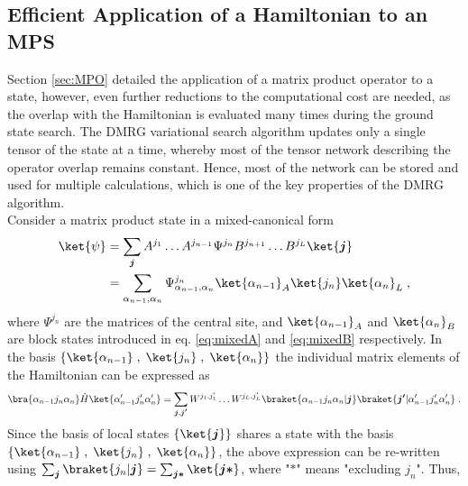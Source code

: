 \subsection{Efficient Application of a Hamiltonian to an MPS}
Section \ref{sec:MPO} detailed the application of a matrix product operator to a state, however, even further reductions to the computational cost are needed, as the overlap with the Hamiltonian is evaluated many times during the ground state search. The DMRG variational search algorithm updates only a single tensor of the state at a time, whereby most of the tensor network describing the operator overlap remains constant. Hence, most of the network can be stored and used for multiple calculations, which is one of the key properties of the DMRG algorithm.\\ 
Consider a matrix product state in a mixed-canonical form
\begin{align}
	\ket{\psi} &= \sum_{\boldsymbol{j}} A^{j_1} \ldots A^{j_{n-1}} \Psi^{j_n} B^{j_{n+1}} \ldots B^{j_{L}} \ket{\boldsymbol{j}} \nonumber \\
	&= \sum_{\alpha_{n-1} , \alpha_{n}} \Psi_{\alpha_{n-1} , \alpha_{n}}^{j_n} \ket{\alpha_{n-1}}_A \ket{j_n}  \ket{\alpha_{n}}_L \; ,
	\label{eq:MPSmixedsingle}
\end{align}
where $\Psi^{j_n}$ are the matrices of the central site, and $\ket{\alpha_{n-1}}_A$ and $\ket{\alpha_{n}}_B$ are block states introduced in eq. \eqref{eq:mixedA} and \eqref{eq:mixedB} respectively. In the basis $\{ \ket{\alpha_{n-1} } \; , \; \ket{ j_n } \; , \; \ket{\alpha_{n} } \}$ the individual matrix elements of the Hamiltonian can be expressed as
\begin{equation*}
	\bra{\alpha_{n-1} j_n \alpha_{n}} \hat{H} \ket{\alpha_{n-1} ' j_n ' \alpha_{n} '} = \sum_{\boldsymbol{j} , \boldsymbol{j'}}  W^{j_1 , j_1 '} \ldots W^{j_L , j_L '}  \braket{\alpha_{n-1} j_n \alpha_{n} | \boldsymbol{j}} \braket{\boldsymbol{j'} | \alpha_{n-1} ' j_n ' \alpha_{n} '} \; . 
\end{equation*}
Since the basis of local states $\{ \ket{\boldsymbol{j}} \}$ shares a state with the basis $\{ \ket{\alpha_{n-1} } \; , \; \ket{ j_n } \; , \; \ket{\alpha_{n} } \}$, the above expression can be re-written using $\sum_{\boldsymbol{j}} \braket{j_n | \boldsymbol{j}} = \sum_{\boldsymbol{j *}} \ket{ \boldsymbol{j *}}$, where "$\boldsymbol{*}$" means "excluding $j_n$". Thus,
